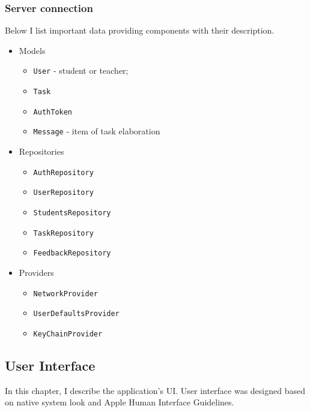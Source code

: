\documentclass[
  biblatex = false,
  language=english,
  figures=false,
  sourcecodes,
  glossaries,
  index
]{kidiplom}
\begin{document}
\subsubsection{Server connection}
Below I list important data providing components with their description.
\begin{itemize}
	\item Models
	\begin{itemize}
		\item \texttt{User} - student or teacher;
		\item \texttt{Task}
		\item \texttt{AuthToken}
		\item \texttt{Message} - item of task elaboration
	\end{itemize}
	\item Repositories
	\begin{itemize}
		\item \texttt{AuthRepository}
		\item \texttt{UserRepository}
		\item \texttt{StudentsRepository}
		\item \texttt{TaskRepository}
		\item \texttt{FeedbackRepository}
	\end{itemize}
	\item Providers
	\begin{itemize}
		\item \texttt{NetworkProvider}
		\item \texttt{UserDefaultsProvider}
		\item \texttt{KeyChainProvider}
	\end{itemize}
\end{itemize}

\subsection{User Interface}
In this chapter, I describe the application's UI. User interface was designed based on native system look and Apple Human Interface Guidelines.
\end{document}
